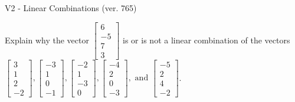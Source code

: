 \begin{exercise}
  \begin{exerciseTitle}V2 - Linear Combinations (ver. 765)\end{exerciseTitle}
  \begin{exerciseStatement}
    Explain why the vector \(\left[\begin{array}{c}
6 \\
-5 \\
7 \\
3
\end{array}\right]\)  is or is not a linear 
	combination of the vectors \(\left[\begin{array}{c}
3 \\
1 \\
2 \\
-2
\end{array}\right] , \left[\begin{array}{c}
-3 \\
1 \\
0 \\
-1
\end{array}\right] , \left[\begin{array}{c}
-2 \\
1 \\
-3 \\
0
\end{array}\right] , \left[\begin{array}{c}
-4 \\
2 \\
0 \\
-3
\end{array}\right] , \text{ and } \left[\begin{array}{c}
-5 \\
2 \\
4 \\
-2
\end{array}\right]\).
	



\end{exerciseStatement}
\end{exercise}
